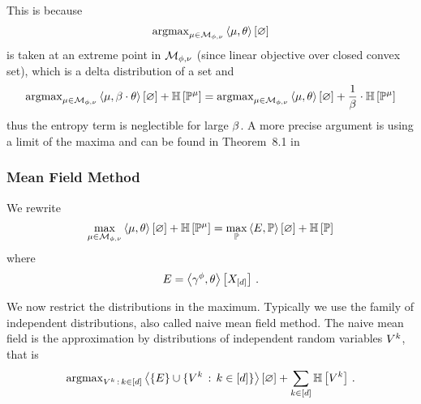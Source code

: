 This is because 
\begin{align*}
	\mathrm{argmax}_{\mu\in\mathcal{M}_{\phi,\nu}}  \left\langle \mu,\theta\right\rangle \left[ \varnothing \right]
\end{align*}
is taken at an extreme point in $\mathcal{M}_{\phi,\nu}$ (since linear objective over closed convex set), which is a delta distribution of a set and
\begin{align*}
	\mathrm{argmax}_{\mu\in\mathcal{M}_{\phi,\nu}}  \left\langle \mu,\beta\cdot\theta\right\rangle \left[ \varnothing \right]+ \mathbb{H}\left[\mathbb{P}^{\mu}\right] 
	= 
	\mathrm{argmax}_{\mu\in\mathcal{M}_{\phi,\nu}}  \left\langle \mu,\theta\right\rangle \left[ \varnothing \right] + \frac{1}{\beta} \cdot \mathbb{H}\left[\mathbb{P}^{\mu}\right] 	
\end{align*}
thus the entropy term is neglectible for large $\beta$.
A more precise argument is using a limit of the maxima and can be found in Theorem~8.1 in \cite{wainwright_graphical_2008}





\subsubsection{Mean Field Method}

We rewrite 
\begin{align*}
	\max_{\mu\in\mathcal{M}_{\phi,\nu}}  \left\langle \mu,\theta\right\rangle \left[ \varnothing \right] + \mathbb{H}\left[\mathbb{P}^{\mu}\right] 
	=
	\max_{\mathbb{P}} \left\langle E,\mathbb{P}\right\rangle \left[ \varnothing \right] + \mathbb{H}\left[\mathbb{P}\right]
\end{align*}
where
	\[ E = \left\langle \gamma^{\phi},\theta\right\rangle \left[ X_{[d]} \right] \, . \]

We now restrict the distributions in the maximum.
Typically we use the family of independent distributions, also called naive mean field method.
The naive mean field is the approximation by distributions of independent random variables $V^{k}$, that is
\begin{align*}
	\mathrm{argmax}_{V^{k} \, : \, k\in[d]} \left\langle \{E\} \cup \{V^{k} \, : \, k\in[d]\}\right\rangle \left[ \varnothing \right]
	+ \sum_{k\in[d]} \mathbb{H}\left[V^{k}\right] \, . 
\end{align*}


